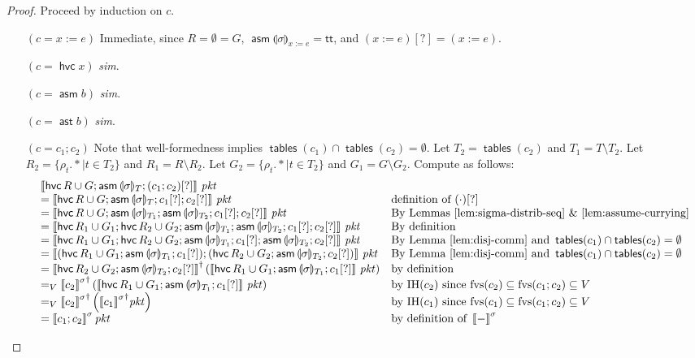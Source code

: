 \documentclass{article}
\newcommand{\pkt}{\mathit{pkt}}
\newcommand{\denote}[1]{\left\llbracket#1\right\rrbracket}
\newcommand{\TRUE}{\mathsf{tt}}
\newcommand{\assert}{\mathop{\mathsf{ast}}}
\newcommand{\assume}{\mathop{\mathsf{asm}}}
\newcommand{\havoc}[1]{\mathop{\mathsf{hvc}}#1}
\newcommand{\state}[1]{\llparenthesis#1\rrparenthesis}
\newcommand{\instr}{[?]}
\newcommand{\fvs}{\textrm{fvs}}
\newcommand{\tables}{\mathop{\mathsf{tables}}}
\theoremstyle{plain}
\theoremstyle{definition}
\theoremstyle{remark}
\begin{document}
\begin{proof}
  Proceed by induction on $c$.
  \begin{enumerate}[align=left]
  \item[$(c = x:=e)$] Immediate, since $R = \emptyset = G$, $\assume{\state\sigma}_{x:=e} = \TRUE$, and $(x:=e)\instr = (x:=e)$.
  \item[$(c = \havoc x)$] \textit{sim}.
  \item[$(c = \assume b)$] \textit{sim}.
  \item[$(c = \assert b)$] \textit{sim}.
  \item[$(c = c_1;c_2)$] Note that well-formedness implies $\tables(c_1) \cap
    \tables(c_2) = \emptyset$. Let $T_2 = \tables(c_2)$ and $T_1 = T \setminus
    T_2$. Let $R_2 = \{\rho_t.* \mid t \in T_2\}$ and $R_1 = R \setminus R_2$.
    Let $G_2 = \{\rho_t.* \mid t \in T_2\}$ and $G_1 = G \setminus G_2$. Compute
    as follows:
    \[\begin{array}{ll}
    \denote{\havoc {R \cup G}; \assume{\state\sigma_{T}};(c_1;c_2)\instr}\,\pkt
    & \\
    = \denote{\havoc{R\cup G}; \assume{\state\sigma_{T}}; c_1\instr;c_2\instr}\,\pkt
    & \text{definition of }(\cdot)\instr \\
    = \denote{\havoc{R\cup G}; \assume{\state\sigma_{T_1}};\assume{\state\sigma_{T_2}};c_1\instr;c_2\instr}\,\pkt
    & \text{By Lemmas~\ref{lem:sigma-distrib-seq} \&~\ref{lem:assume-currying}} \\
    = \denote{\havoc{R_1 \cup G_1}; \havoc{R_2 \cup G_2}; \assume{\state\sigma_{T_1}};\assume{\state\sigma_{T_2}};c_1\instr;c_2\instr}\,\pkt
    & \text{By definition } \\
    = \denote{\havoc{R_1\cup G_1}; \havoc{R_2 \cup G_2}; \assume{\state\sigma_{T_1}};c_1\instr;\assume{\state\sigma_{T_2}};c_2\instr}\,\pkt
    & \text{By Lemma~\ref{lem:disj-comm} and } \tables(c_1) \cap \tables(c_2) = \emptyset \\
    = \denote{(\havoc{R_1 \cup G_1}; \assume{\state\sigma_{T_1}};c_1\instr);
      (\havoc{R_2 \cup G_2};\assume{\state\sigma_{T_2}};c_2\instr)}\,\pkt
    & \text{By Lemma~\ref{lem:disj-comm} and } \tables(c_1) \cap \tables(c_2) = \emptyset\\
    = \denote{\havoc{R_2 \cup G_2};\assume{\state\sigma_{T_2}};c_2\instr}^\dagger
    \left(\denote{\havoc{R_1 \cup G_1}; \assume{\state\sigma_{T_1}};c_1\instr}\,\pkt\right)
    & \text{by definition} \\
    =_V {\denote{c_2}^\sigma}^\dagger \left(\denote{\havoc{R_1 \cup G_1}; \assume{\state\sigma_{T_1}};c_1\instr}\,\pkt\right)
    & \text{by IH}(c_2) \text{ since } \fvs(c_2) \subseteq \fvs(c_1;c_2) \subseteq V \\
    =_V {\denote{c_2}^\sigma}^\dagger \left({\denote{c_1}^\sigma}^\dagger\pkt\right)
    & \text{by IH}(c_1) \text{ since } \fvs(c_1) \subseteq \fvs(c_1;c_2) \subseteq V \\
    = \denote{c_1;c_2}^\sigma\pkt
    & \text{by definition of }\denote{-}^\sigma\\
    \end{array}\]


\end{enumerate}
\end{proof}
\end{document}
